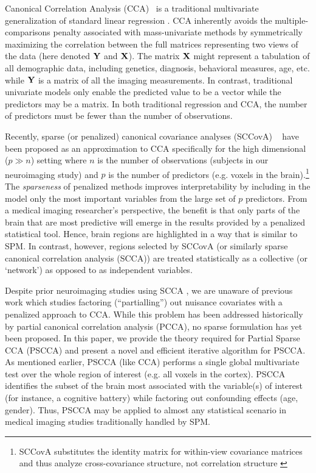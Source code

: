 \documentclass{llncs}
\newcommand{\X}{{\bf X}}
\newcommand{\Y}{{\bf Y}}
\begin{document}
Canonical Correlation Analysis (CCA)~\cite{hotellingcca} is a
traditional multivariate generalization of standard linear regression
\cite{kshirsagar}.  CCA inherently avoids the multiple-comparisons
penalty associated with mass-univariate methods by symmetrically
maximizing the correlation between the full matrices representing two
views of the data (here denoted $\Y$ and $\X$).  The matrix {$\X$}
might represent a tabulation of all demographic data, including
genetics, diagnosis, behavioral measures, age, etc. while $\Y$ is a
matrix of all the imaging measurements.  In contrast, traditional
univariate models only enable the predicted value to be a vector while
the predictors may be a matrix.  In both traditional regression and CCA, the
number of predictors must be fewer than the number of observations.

Recently, sparse (or penalized) canonical covariance
analyses (SCCovA) ~\cite{parkhomenko,witten,lykou} have been proposed
as an approximation to CCA specifically for the high dimensional
($p\gg n$) setting where $n$ is the number of observations (subjects
in our neuroimaging study) and $p$ is the number of predictors (e.g. voxels
in the brain).\footnote{SCCovA substitutes the identity matrix for
within-view covariance matrices and thus analyze cross-covariance
structure, not correlation structure \cite{cherry}}  The {\em
sparseness} of penalized methods improves interpretability by including in the model
only the most important variables from the large set of $p$
predictors.  From a medical imaging researcher's perspective, the
benefit is that only parts of the brain that are most predictive will
emerge in the results provided by a penalized statistical tool.
Hence, brain regions are highlighted in a way that is similar to
SPM.  In contrast, however, regions selected by SCCovA (or similarly
sparse canonical correlation analysis (SCCA)) are treated
statistically as a collective (or `network') as opposed to as
independent variables.

Despite prior neuroimaging studies using SCCA \cite{Avants2010b}, we
are unaware of previous work which studies factoring (``partialling'')
out nuisance covariates with a penalized approach to CCA.  While this
problem has been addressed historically by partial canonical
correlation analysis (PCCA)\cite{timm}, no sparse formulation has yet been
proposed.  In this paper, we provide the theory required for Partial Sparse CCA
(PSCCA) and present a novel and efficient iterative algorithm for
PSCCA. As mentioned earlier, PSCCA (like CCA) performs a single global
multivariate test over the whole region of interest (e.g. all
voxels in the cortex). PSCCA identifies
the subset of the brain most associated with the variable(s) of interest
(for instance, a cognitive battery) while factoring out confounding
effects (age, gender).  Thus, PSCCA may be applied to almost any statistical
scenario in medical imaging studies traditionally handled by SPM.  
\end{document}
